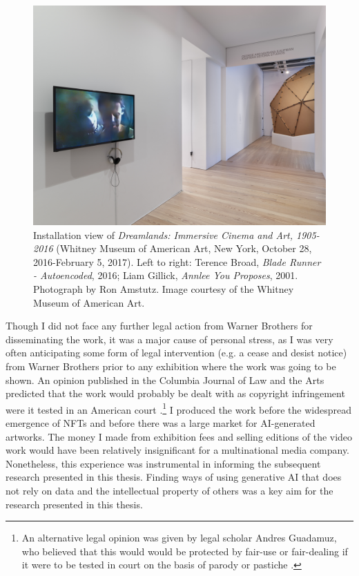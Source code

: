 \begin{figure}[!htb]
    \centering
    \captionsetup{justification=centering}
    \includegraphics[width=1\textwidth]{figures/c1_intro/whitney-installation-shot.png}
    \caption[Installation shot of \textit{Blade Runner --- Autoencoded}]{Installation view of \textit{Dreamlands: Immersive Cinema and Art, 1905-2016} (Whitney Museum of American Art, New York, October 28, 2016-February 5, 2017). Left to right: Terence Broad, \textit{Blade Runner - Autoencoded}, 2016; Liam Gillick, \textit{Annlee You Proposes}, 2001. Photograph by Ron Amstutz. Image courtesy of the Whitney Museum of American Art.}
    \label{fig:c1:blade-runner-whitney}
\end{figure}

Though I did not face any further legal action from Warner Brothers for  disseminating the work, it was a major cause of personal stress, as I was very often anticipating some form of legal intervention (e.g. a cease and desist notice) from Warner Brothers prior to any exhibition where the work was going to be shown.
An opinion published in the Columbia Journal of Law and the Arts predicted that the work would probably be dealt with as copyright infringement were it tested in an American court \citep{sobel2017artificial}.\footnote{An alternative legal opinion was given by legal scholar Andres Guadamuz, who believed that this would would be protected by fair-use or fair-dealing if it were to be tested in court on the basis of parody or pastiche \citep{guadamuz2024personal}.} 
I produced the work before the widespread emergence of NFTs and before there was a large market for AI-generated artworks. 
The money I made from exhibition fees and selling editions of the video work would have been relatively insignificant for a multinational media company. 
Nonetheless, this experience was instrumental in informing the subsequent research presented in this thesis. 
Finding ways of using generative AI that does not rely on data and the intellectual property of others was a key aim for the research presented in this thesis.


